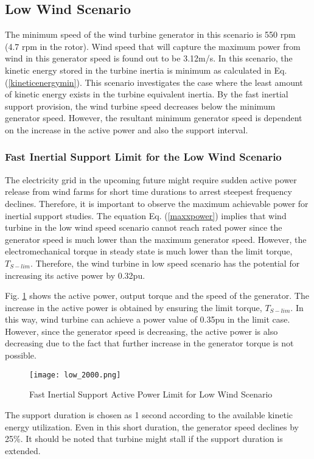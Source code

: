 \subsection{Low Wind Scenario}
\label{sec:lowwind}
The minimum speed of the wind turbine generator in this scenario is 550 rpm (4.7 rpm in the rotor). Wind speed that will capture the maximum power from wind in this generator speed is found out to be 3.12m/s. In this scenario, the kinetic energy stored in the turbine inertia is minimum as calculated in Eq. (\ref{kineticenergymin}). This scenario investigates the case where the least amount of kinetic energy exists in the turbine equivalent inertia. By the fast inertial support provision, the wind turbine speed decreases below the minimum generator speed. However, the resultant minimum generator speed is dependent on the increase in the active power and also the support interval.
\subsubsection{Fast Inertial Support Limit for the Low Wind Scenario}
The electricity grid in the upcoming future might require sudden active power release from wind farms for short time durations to arrest steepest frequency declines. Therefore, it is important to observe the maximum achievable power for inertial support studies. The equation Eq. (\ref{maxxpower}) implies that wind turbine in the low wind speed scenario cannot reach rated power since the generator speed is much lower than the maximum generator speed. However, the electromechanical torque in steady state is much lower than the limit torque, $T_{S-lim}$. Therefore, the wind turbine in low speed scenario has the potential for increasing its active power by 0.32pu.\par
Fig. \ref{low_limit_power} shows the active power, output torque and the speed of the generator. The increase in the active power is obtained by ensuring the limit torque, $T_{S-lim}$. In this way, wind turbine can achieve a power value of 0.35pu in the limit case. However, since the generator speed is decreasing, the active power is also decreasing due to the fact that further increase in the generator torque is not possible. \par
\begin{figure}[h]
	\centering
	\texttt{[image: low\_2000.png]}
	\caption{Fast Inertial Support Active Power Limit for Low Wind Scenario}
	\label{low_limit_power}
\end{figure}
The support duration is chosen as 1 second according to the available kinetic energy utilization. Even in this short duration, the generator speed declines by 25\%. It should be noted that turbine might stall if the support duration is extended. \par
